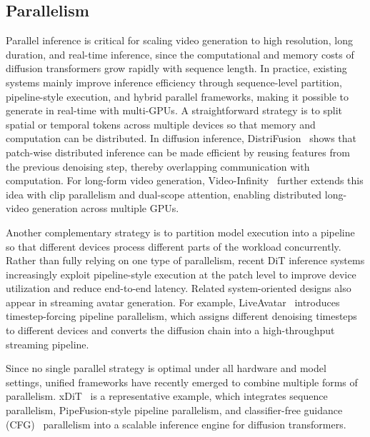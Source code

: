 \documentclass[lettersize,journal]{IEEEtran}
\begin{document}
\subsection{Parallelism}
Parallel inference is critical for scaling video generation to high resolution, long duration, and real-time inference, since the computational and memory costs of diffusion transformers grow rapidly with sequence length. In practice, existing systems mainly improve inference efficiency through sequence-level partition, pipeline-style execution, and hybrid parallel frameworks, making it possible to generate in real-time with multi-GPUs.
A straightforward strategy is to split spatial or temporal tokens across multiple devices so that memory and computation can be distributed. In diffusion inference, DistriFusion~\cite{li2024distrifusion} shows that patch-wise distributed inference can be made efficient by reusing features from the previous denoising step, thereby overlapping communication with computation. For long-form video generation, Video-Infinity~\cite{chen2024videoinfinity} further extends this idea with clip parallelism and dual-scope attention, enabling distributed long-video generation across multiple GPUs.


Another complementary strategy is to partition model execution into a pipeline so that different devices process different parts of the workload concurrently. Rather than fully relying on one type of parallelism, recent DiT inference systems increasingly exploit pipeline-style execution at the patch level to improve device utilization and reduce end-to-end latency. Related system-oriented designs also appear in streaming avatar generation. For example, LiveAvatar~\cite{huang2025live} introduces timestep-forcing pipeline parallelism, which assigns different denoising timesteps to different devices and converts the diffusion chain into a high-throughput streaming pipeline.

Since no single parallel strategy is optimal under all hardware and model settings, unified frameworks have recently emerged to combine multiple forms of parallelism. xDiT~\cite{fang2024xdit} is a representative example, which integrates sequence parallelism, PipeFusion-style pipeline parallelism, and classifier-free guidance (CFG)~\cite{ho2022classifier} parallelism into a scalable inference engine for diffusion transformers.
\end{document}
